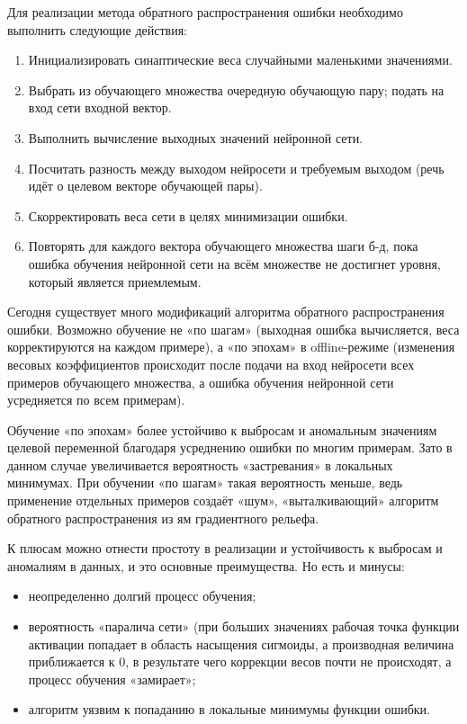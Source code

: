 Для реализации метода обратного распространения ошибки необходимо выполнить следующие действия:
\begin{enumerate}
  \item Инициализировать синаптические веса случайными маленькими значениями.
  \item Выбрать из обучающего множества очередную обучающую пару; подать на вход сети входной вектор.
  \item Выполнить вычисление выходных значений нейронной сети.
  \item Посчитать разность между выходом нейросети и требуемым выходом (речь идёт о целевом векторе обучающей пары).
  \item Скорректировать веса сети в целях минимизации ошибки.
  \item Повторять для каждого вектора обучающего множества шаги б-д, пока ошибка обучения нейронной сети на всём множестве не достигнет уровня, который является приемлемым.
\end{enumerate}

Сегодня существует много модификаций алгоритма обратного распространения ошибки. Возможно обучение не «по шагам»
(выходная ошибка вычисляется, веса корректируются на каждом примере), а «по эпохам» в offline-режиме (изменения весовых
коэффициентов происходит после подачи на \linebreak вход нейросети всех примеров обучающего множества, а ошибка обучения нейронной
сети усредняется по всем примерам).

Обучение «по эпохам» более устойчиво к выбросам и аномальным значениям целевой переменной благодаря усреднению ошибки
по многим примерам. Зато в данном случае увеличивается вероятность «застревания» в локальных минимумах. При обучении
«по шагам» такая вероятность меньше, ведь применение отдельных примеров создаёт «шум», «выталкивающий» алгоритм
обратного распространения из ям градиентного рельефа.

К плюсам можно отнести простоту в реализации и устойчивость к выбросам и аномалиям в данных, и это основные преимущества.
Но есть и минусы:
\begin{itemize}
  \item неопределенно долгий процесс обучения;
  \item вероятность «паралича сети» (при больших значениях рабочая точка функции активации попадает в область насыщения сигмоиды, а производная величина приближается к 0, в результате чего коррекции весов почти не происходят, а процесс обучения «замирает»;
  \item алгоритм уязвим к попаданию в локальные минимумы функции \linebreak ошибки.
\end{itemize}

